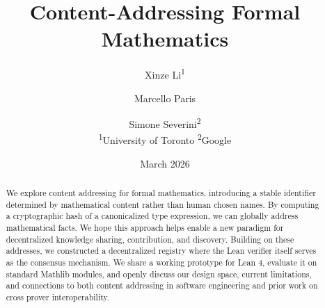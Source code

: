 \documentclass[11pt]{article}
\title{\textbf{Content-Addressing Formal Mathematics}}
\author{Xinze Li\textsuperscript{1} \and Marcello Paris \and Simone Severini\textsuperscript{2} \\[4pt]
\textsuperscript{1}University of Toronto \quad \textsuperscript{2}Google}
\date{March 2026}
\begin{document}
\maketitle

\begin{abstract}
We explore content addressing for formal mathematics, introducing a stable identifier determined by mathematical content rather than human chosen names. By computing a cryptographic hash of a canonicalized type expression, we can globally address mathematical facts. We hope this approach helps enable a new paradigm for decentralized knowledge sharing, contribution, and discovery. Building on these addresses, we constructed a decentralized registry where the Lean verifier itself serves as the consensus mechanism. We share a working prototype for Lean 4, evaluate it on standard Mathlib modules, and openly discuss our design space, current limitations, and connections to both content addressing in software engineering and prior work on cross prover interoperability.
\end{abstract}














\end{document}
